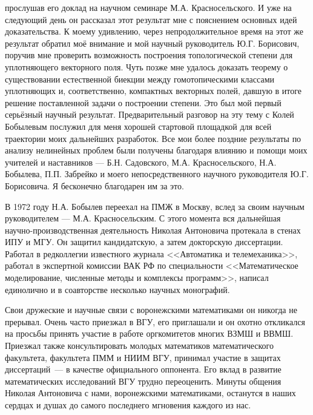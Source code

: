 прослушав его доклад на научном семинаре М.А. Красносельского. И уже
на следующий день он рассказал этот результат мне с пояснением
основных идей доказательства. К моему удивлению, через
непродолжительное время на этот же результат обратил моё внимание и
мой научный руководитель Ю.Г. Борисович, поручив мне проверить
возможность построения топологической степени для уплотняющего
векторного поля. Чуть позже мне удалось доказать теорему о
существовании естественной биекции между гомотопическими классами
уплотняющих и, соответственно, компактных векторных полей, давшую в
итоге решение поставленной задачи о построении степени. Это был мой
первый серьёзный научный результат. Предварительный разговор на эту
тему с Колей Бобылевым послужил для меня хорошей стартовой площадкой
для всей траектории моих дальнейших разработок. Все мои более
поздние результаты по анализу нелинейных проблем были получены
благодаря влиянию и помощи моих учителей и наставников --- Б.Н.
Садовского, М.А. Красносельского, Н.А. Бобылева, П.П. Забрейко и
моего непосредственного научного руководителя Ю.Г. Борисовича. Я
бесконечно благодарен им за это.

В 1972 году Н.А. Бобылев переехал на ПМЖ в Москву, вслед за своим
научным руководителем --- М.А. Красносельским. С этого момента вся
дальнейшая на\-уч\-но-про\-из\-вод\-ствен\-ная деятельность Николая
Антоновича протекала в стенах ИПУ и МГУ. Он защитил кандидатскую, а
затем докторскую диссертации. Работал в редколлегии известного
журнала <<Автоматика и телемеханика>>, работал в экспертной комиссии
ВАК РФ по специальности <<Математическое моделирование, численные
методы и комплексы программ>>, написал единолично и в соавторстве
несколько научных монографий.

Свои дружеские и научные связи с воронежскими математиками он
никогда не прерывал. Очень часто приезжал в ВГУ, его приглашали и он
охотно откликался на просьбы принять участие в работе оргкомитетов
многих ВЗМШ и ВВМШ. Приезжал также консультировать молодых
математиков математического факультета, факультета ПММ и НИИМ ВГУ,
принимал участие в защитах диссертаций~--- в качестве официального
оппонента. Его вклад в развитие математических исследований ВГУ
трудно переоценить. Минуты общения Николая Антоновича с нами,
воронежскими математиками, останутся в наших сердцах и душах до
самого последнего мгновения каждого из нас.
